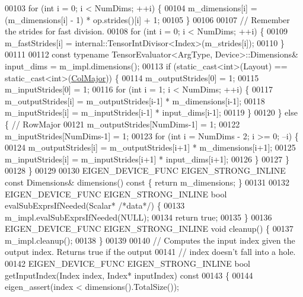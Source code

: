 \begin{DoxyCode}
00103     \textcolor{keywordflow}{for} (\textcolor{keywordtype}{int} i = 0; i < NumDims; ++i) \{
00104       m\_dimensions[i] = (m\_dimensions[i] - 1) * op.strides()[i] + 1;
00105     \}
00106 
00107     \textcolor{comment}{// Remember the strides for fast division.}
00108     \textcolor{keywordflow}{for} (\textcolor{keywordtype}{int} i = 0; i < NumDims; ++i) \{
00109       m\_fastStrides[i] = internal::TensorIntDivisor<Index>(m\_strides[i]);
00110     \}
00111 
00112     \textcolor{keyword}{const} \textcolor{keyword}{typename} TensorEvaluator<ArgType, Device>::Dimensions& input\_dims = m\_impl.dimensions();
00113     \textcolor{keywordflow}{if} (static\_cast<int>(Layout) == static\_cast<int>(\hyperlink{group__enums_ggaacded1a18ae58b0f554751f6cdf9eb13a0cbd4bdd0abcfc0224c5fcb5e4f6669a}{ColMajor})) \{
00114       m\_outputStrides[0] = 1;
00115       m\_inputStrides[0] = 1;
00116       \textcolor{keywordflow}{for} (\textcolor{keywordtype}{int} i = 1; i < NumDims; ++i) \{
00117         m\_outputStrides[i] = m\_outputStrides[i-1] * m\_dimensions[i-1];
00118         m\_inputStrides[i] = m\_inputStrides[i-1] * input\_dims[i-1];
00119       \}
00120     \} \textcolor{keywordflow}{else} \{  \textcolor{comment}{// RowMajor}
00121       m\_outputStrides[NumDims-1] = 1;
00122       m\_inputStrides[NumDims-1] = 1;
00123       \textcolor{keywordflow}{for} (\textcolor{keywordtype}{int} i = NumDims - 2; i >= 0; --i) \{
00124         m\_outputStrides[i] = m\_outputStrides[i+1] * m\_dimensions[i+1];
00125         m\_inputStrides[i] = m\_inputStrides[i+1] * input\_dims[i+1];
00126       \}
00127     \}
00128   \}
00129 
00130   EIGEN\_DEVICE\_FUNC EIGEN\_STRONG\_INLINE \textcolor{keyword}{const} Dimensions& dimensions()\textcolor{keyword}{ const }\{ \textcolor{keywordflow}{return} m\_dimensions; \}
00131 
00132   EIGEN\_DEVICE\_FUNC EIGEN\_STRONG\_INLINE \textcolor{keywordtype}{bool} evalSubExprsIfNeeded(Scalar* \textcolor{comment}{/*data*/}) \{
00133     m\_impl.evalSubExprsIfNeeded(NULL);
00134     \textcolor{keywordflow}{return} \textcolor{keyword}{true};
00135   \}
00136   EIGEN\_DEVICE\_FUNC EIGEN\_STRONG\_INLINE \textcolor{keywordtype}{void} cleanup() \{
00137     m\_impl.cleanup();
00138   \}
00139 
00140   \textcolor{comment}{// Computes the input index given the output index. Returns true if the output}
00141   \textcolor{comment}{// index doesn't fall into a hole.}
00142   EIGEN\_DEVICE\_FUNC EIGEN\_STRONG\_INLINE \textcolor{keywordtype}{bool} getInputIndex(Index index, Index* inputIndex)\textcolor{keyword}{ const}
00143 \textcolor{keyword}{  }\{
00144     eigen\_assert(index < dimensions().TotalSize());

\end{DoxyCode}
